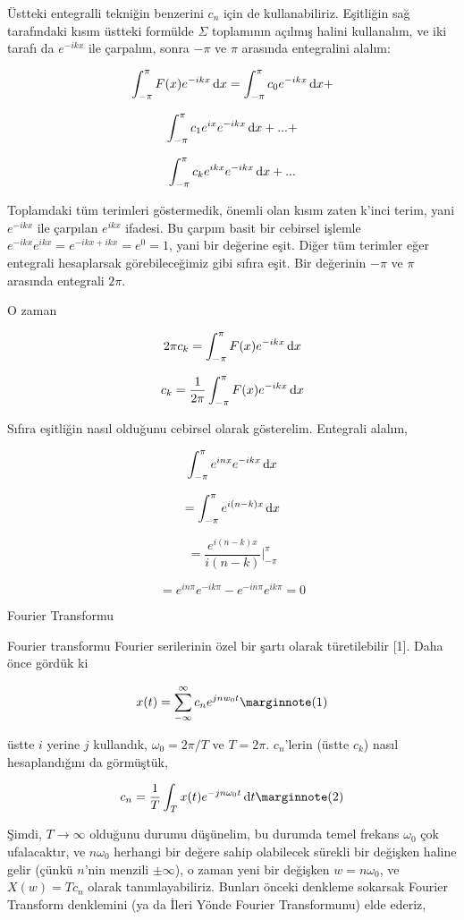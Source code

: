 \documentclass[12pt,fleqn]{article}\usepackage{../../common}
\begin{document}
Üstteki entegralli tekniğin benzerini $c_n$ için de
kullanabiliriz. Eşitliğin sağ tarafındaki kısım üstteki formülde
$\Sigma$ toplamının açılmış halini kullanalım, ve iki tarafı da
$e^{-ikx}$ ile çarpalım, sonra $-\pi$ ve $\pi$ arasında entegralini
alalım:

$$ \int_{-\pi}^{\pi}F(x)e^{-ikx}\,\mathrm{d} x = \int_{-\pi}^{\pi}c_0e^{-ikx}\,\mathrm{d} x + $$

$$ \int_{-\pi}^{\pi}c_1e^{ix}e^{-ikx}\,\mathrm{d} x + ... +  $$

$$ \int_{-\pi}^{\pi}c_ke^{ikx}e^{-ikx}\,\mathrm{d} x + ... $$

Toplamdaki tüm terimleri göstermedik, önemli olan kısım zaten k'inci terim, yani
$e^{-ikx}$ ile çarpılan $e^{ikx}$ ifadesi. Bu çarpım basit bir cebirsel işlemle
$e^{-ikx}e^{ikx} = e^{-ikx + ikx} = e^{0} = 1$, yani bir değerine eşit. Diğer
tüm terimler eğer entegrali hesaplarsak görebileceğimiz gibi sıfıra eşit. Bir
değerinin $-\pi$ ve $\pi$ arasında entegrali $2\pi$. 

O zaman

$$ 2\pi c_k = \int_{-\pi}^{\pi}F(x)e^{-ikx}\,\mathrm{d} x $$

$$ c_k = \frac{1}{2\pi}\int_{-\pi}^{\pi}F(x)e^{-ikx}\,\mathrm{d} x $$

Sıfıra eşitliğin nasıl olduğunu cebirsel olarak gösterelim. Entegrali alalım,

$$ \int_{-\pi}^{\pi}e^{inx}e^{-ikx}\,\mathrm{d} x $$

$$ = \int_{-\pi}^{\pi}e^{i(n-k)x}\,\mathrm{d} x $$

$$ = \frac{e^{i(n-k)x}}{i(n-k)} \bigg|_{-\pi}^{\pi}  $$

$$ = e^{in\pi}e^{-ik\pi} - e^{-in\pi}e^{ik\pi} = 0 $$

Fourier Transformu

Fourier transformu Fourier serilerinin özel bir şartı olarak türetilebilir
[1]. Daha önce gördük ki 

$$ 
x(t) = \sum _{-\infty}^{\infty} c_n e^{jnw_0t} 
\mlabel{1} 
$$

üstte $i$ yerine $j$ kullandık, $\omega_0 = 2\pi / T$ ve $T = 2\pi$. $c_n$'lerin
(üstte $c_k$) nasıl hesaplandığını da görmüştük,

$$ 
c_n = \frac{1}{T} \int_{T} x(t) e^{-jn\omega_0t} \ud t 
\mlabel{2} 
$$

Şimdi, $T \to \infty$ olduğunu durumu düşünelim, bu durumda temel frekans
$\omega_0$ çok ufalacaktır, ve $n\omega_0$ herhangi bir değere sahip
olabilecek sürekli bir değişken haline gelir (çünkü $n$'nin menzili
$\pm \infty$), o zaman yeni bir değişken $w = n\omega_0$, ve $X(w) = Tc_n$
olarak tanımlayabiliriz. Bunları önceki denkleme sokarsak Fourier Transform
denklemini (ya da İleri Yönde Fourier Transformunu) elde ederiz,
\end{document}
